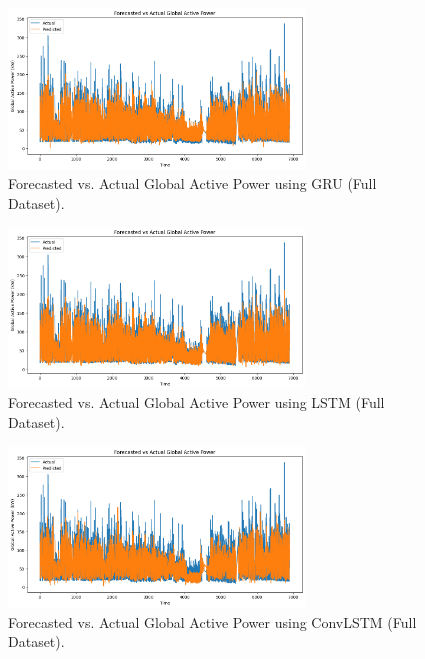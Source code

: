 	\begin{figure}[h]
		\centering
		\includegraphics[width=0.7\textwidth]{./figures_aman/path_to_gru_full_plot.png}
		\caption{Forecasted vs. Actual Global Active Power using GRU (Full Dataset).}
		\label{fig:gru_full}
	\end{figure}
	
	\begin{figure}[h]
		\centering
		\includegraphics[width=0.7\textwidth]{./figures_aman/path_to_lstm_full_plot.png}
		\caption{Forecasted vs. Actual Global Active Power using LSTM (Full Dataset).}
		\label{fig:lstm_full}
	\end{figure}
	
	\begin{figure}[h]
		\centering
		\includegraphics[width=0.7\textwidth]{./figures_aman/path_to_convlstm_full_plot.png}
		\caption{Forecasted vs. Actual Global Active Power using ConvLSTM (Full Dataset).}
		\label{fig:convlstm_full}
	\end{figure}
	
